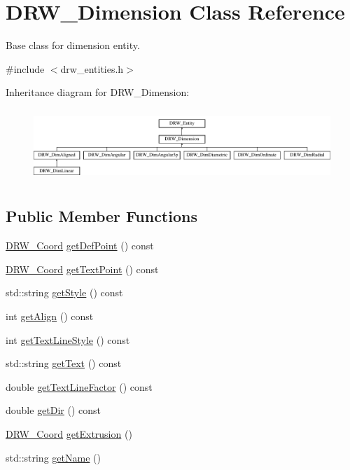 \hypertarget{class_d_r_w___dimension}{}\section{D\+R\+W\+\_\+\+Dimension Class Reference}
\label{class_d_r_w___dimension}


Base class for dimension entity.  




{\ttfamily \#include $<$drw\+\_\+entities.\+h$>$}

Inheritance diagram for D\+R\+W\+\_\+\+Dimension\+:\begin{figure}[H]
\begin{center}
\leavevmode
\includegraphics[height=2.765432cm]{df/d1d/class_d_r_w___dimension}
\end{center}
\end{figure}
\subsection*{Public Member Functions}
\begin{DoxyCompactItemize}
\item 
\hyperlink{class_d_r_w___coord}{D\+R\+W\+\_\+\+Coord} \hyperlink{class_d_r_w___dimension_aff7c5b5035b520428c2a0c181f7cb102}{get\+Def\+Point} () const 
\item 
\hyperlink{class_d_r_w___coord}{D\+R\+W\+\_\+\+Coord} \hyperlink{class_d_r_w___dimension_aa7dcaa119dfc8aaacdf093067ac5a781}{get\+Text\+Point} () const 
\item 
std\+::string \hyperlink{class_d_r_w___dimension_a617836523c243ac0cec7871dcee13518}{get\+Style} () const 
\item 
int \hyperlink{class_d_r_w___dimension_ac4423a75a6bf64525e096fe72938bfd7}{get\+Align} () const 
\item 
int \hyperlink{class_d_r_w___dimension_a5774fd11d8745a32e6c2a94a697a3584}{get\+Text\+Line\+Style} () const 
\item 
std\+::string \hyperlink{class_d_r_w___dimension_a34b21f424946313158384673fb5bc885}{get\+Text} () const 
\item 
double \hyperlink{class_d_r_w___dimension_a92f00fef72a9f5de2058360f7ce4d518}{get\+Text\+Line\+Factor} () const 
\item 
double \hyperlink{class_d_r_w___dimension_afce2fe039bfbff29ef8dca9ab5d4d41c}{get\+Dir} () const 
\item 
\hyperlink{class_d_r_w___coord}{D\+R\+W\+\_\+\+Coord} \hyperlink{class_d_r_w___dimension_acbbe026791231ce980ad2adcf0a259c2}{get\+Extrusion} ()
\item 
std\+::string \hyperlink{class_d_r_w___dimension_aece5c640691b5ee65674e852ea2ea812}{get\+Name} ()
\end{DoxyCompactItemize}
